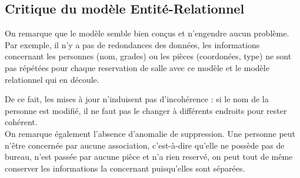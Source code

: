 \subsection{Critique du modèle Entité-Relationnel}
	On remarque que le modèle semble bien conçus et n'engendre aucun problème. Par exemple, il n'y a pas de redondances des données, les informations concernant les personnes (nom, grades) ou les pièces (coordonées, type) ne sont pas répétées pour chaque reservation de salle avec ce modèle et le modèle relationnel qui en découle. 
	
	De ce fait, les mises à jour n'induisent pas d'incohérence : si le nom de la personne est modifié, il ne faut pas le changer à différents endroits pour rester cohérent.\\
	
	On remarque également l'absence d'anomalie de suppression. Une personne peut n'être concernée par aucune association, c'est-à-dire qu'elle ne possède pas de bureau, n'est passée par aucune pièce et n'a rien reservé, on peut tout de même conserver les informations la concernant puisqu'elles sont séparées.

